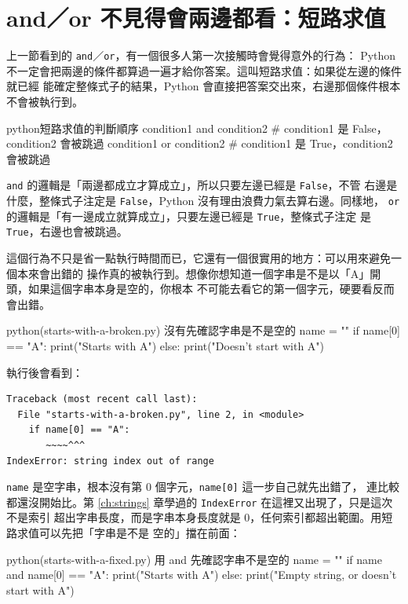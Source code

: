\section{and／or 不見得會兩邊都看：短路求值}
\label{sec:short-circuit}

上一節看到的 \texttt{and}／\texttt{or}，有一個很多人第一次接觸時會覺得意外的行為：
Python 不一定會把兩邊的條件都算過一遍才給你答案。這叫短路求值：如果從左邊的條件就已經
能確定整條式子的結果，Python 會直接把答案交出來，右邊那個條件根本不會被執行到。

\begin{code}{python}{短路求值的判斷順序}
condition1 and condition2   # condition1 是 False，condition2 會被跳過
condition1 or condition2    # condition1 是 True，condition2 會被跳過
\end{code}

\texttt{and} 的邏輯是「兩邊都成立才算成立」，所以只要左邊已經是 \texttt{False}，不管
右邊是什麼，整條式子注定是 \texttt{False}，Python 沒有理由浪費力氣去算右邊。同樣地，
\texttt{or} 的邏輯是「有一邊成立就算成立」，只要左邊已經是 \texttt{True}，整條式子注定
是 \texttt{True}，右邊也會被跳過。

這個行為不只是省一點執行時間而已，它還有一個很實用的地方：可以用來避免一個本來會出錯的
操作真的被執行到。想像你想知道一個字串是不是以「A」開頭，如果這個字串本身是空的，你根本
不可能去看它的第一個字元，硬要看反而會出錯。

\begin{example}{python}{(starts-with-a-broken.py) 沒有先確認字串是不是空的}
name = ""
if name[0] == "A":
    print("Starts with A")
else:
    print("Doesn't start with A")
\end{example}

執行後會看到：

\begin{verbatim}
Traceback (most recent call last):
  File "starts-with-a-broken.py", line 2, in <module>
    if name[0] == "A":
       ~~~~^^^
IndexError: string index out of range
\end{verbatim}

\texttt{name} 是空字串，根本沒有第 0 個字元，\texttt{name[0]} 這一步自己就先出錯了，
連比較都還沒開始比。第 \ref{ch:strings} 章學過的 \texttt{IndexError} 在這裡又出現了，只是這次不是索引
超出字串長度，而是字串本身長度就是 0，任何索引都超出範圍。用短路求值可以先把「字串是不是
空的」擋在前面：

\begin{example}{python}{(starts-with-a-fixed.py) 用 and 先確認字串不是空的}
name = ""
if name and name[0] == "A":
    print("Starts with A")
else:
    print("Empty string, or doesn't start with A")
\end{example}

